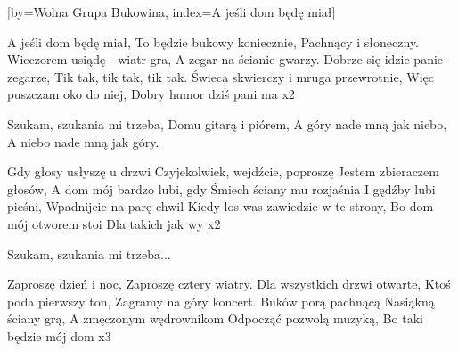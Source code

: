 [by={Wolna Grupa Bukowina},
                     index={A jeśli dom będę miał}]
\beginverse

A jeśli dom będę miał,
To będzie bukowy koniecznie,
Pachnący i słoneczny.
Wieczorem usiądę - wiatr gra,
A zegar na ścianie gwarzy.
Dobrze się idzie panie zegarze,
Tik tak, tik tak, tik tak.
Świeca skwierczy i mruga przewrotnie,
Więc puszczam oko do niej,
Dobry humor dziś pani ma  x2

\endverse
\beginverse

Szukam, szukania mi trzeba,
Domu gitarą i piórem,
A góry nade mną jak niebo,
A niebo nade mną jak góry.

\endverse
\beginverse

Gdy głosy usłyszę u drzwi
Czyjekolwiek, wejdźcie, poproszę
Jestem zbieraczem głosów,
A dom mój bardzo lubi, gdy
Śmiech ściany mu rozjaśnia
I gędźby lubi pieśni,
Wpadnijcie na parę chwil
Kiedy los was zawiedzie w te strony,
Bo dom mój otworem stoi
Dla takich jak wy x2

\endverse
\beginverse

Szukam, szukania mi trzeba...

\endverse
\beginverse

Zaproszę dzień i noc,
Zaproszę cztery wiatry.
Dla wszystkich drzwi otwarte,
Ktoś poda pierwszy ton,
Zagramy na góry koncert.
Buków porą pachnącą
Nasiąkną ściany grą,
A zmęczonym wędrownikom
Odpocząć pozwolą muzyką,
Bo taki będzie mój dom x3

\endverse
\endsong